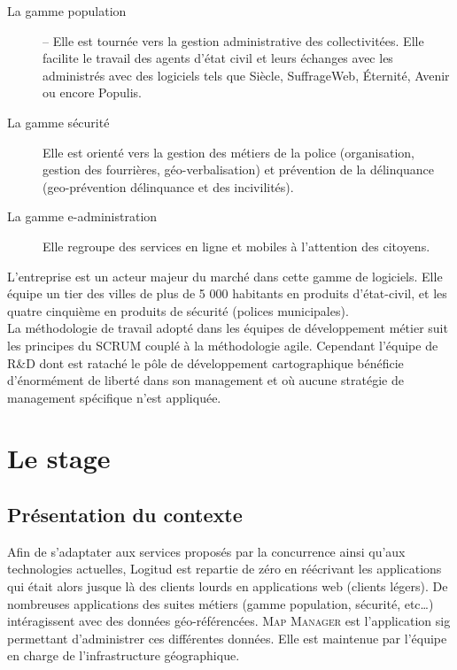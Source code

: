 \documentclass{rapportUHA40}
\begin{document}
\begin{description}
  \item[La gamme population] – Elle est tournée vers la gestion administrative des
    collectivitées. Elle facilite le travail des agents d'état civil et leurs
    échanges avec les administrés avec des logiciels tels que Siècle, SuffrageWeb,
    Éternité, Avenir ou encore Populis.
  \item[La gamme sécurité] Elle est orienté vers la gestion des métiers de la police
    (organisation, gestion des fourrières, géo-verbalisation) et prévention de la
    délinquance (geo-prévention délinquance et des incivilités).
  \item[La gamme e-administration] Elle regroupe des services en ligne et mobiles à
    l'attention des citoyens.
\end{description}

L'entreprise est un acteur majeur du marché dans cette gamme de logiciels. Elle
équipe un tier des villes de plus de 5 000 habitants en produits d’état-civil,
et les quatre cinquième en produits de sécurité (polices municipales).\\

La méthodologie de travail adopté dans les équipes de développement métier suit
les principes du \gls{SCRUM} couplé à la méthodologie \Gls{agile}. Cependant
l'équipe de R\&D dont est rataché le pôle de développement cartographique
bénéficie d'énormément de liberté dans son management et où aucune stratégie de
management spécifique n'est appliquée.

\newpage
\section{Le stage}
\subsection{Présentation du contexte}

Afin de s'adaptater aux services proposés par la concurrence ainsi qu'aux
technologies actuelles, Logitud est repartie de zéro en réécrivant les
applications qui était alors jusque là des clients lourds en applications web
(clients légers). De nombreuses applications des suites métiers (gamme
population, sécurité, etc\ldots) intéragissent avec des données
géo-référencées. \textsc{Map Manager} est l'application \gls{sig} permettant
d’administrer ces différentes données. Elle est maintenue par l’équipe en
charge de l’infrastructure géographique.
\end{document}
